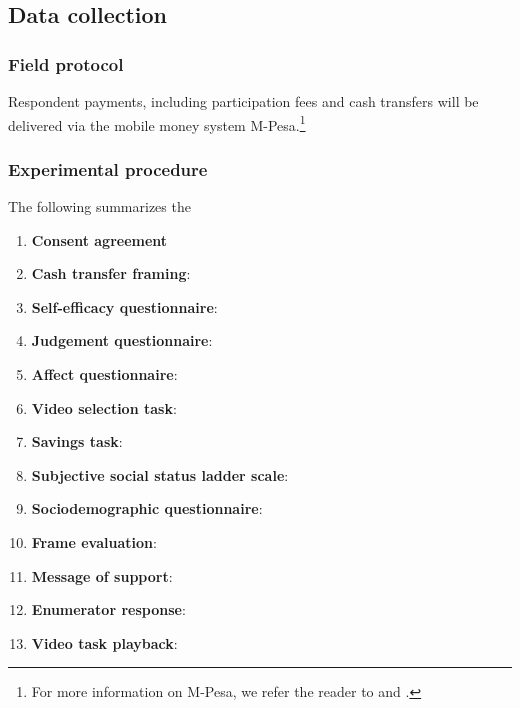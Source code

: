 \documentclass[11pt, a4paper]{article}\usepackage[]{graphicx}\usepackage[]{color}
\begin{document}
    \subsection{Data collection}

        \subsubsection{Field protocol}


            Respondent payments, including participation fees and cash transfers will be delivered via the mobile money system M-Pesa.\footnote{For more information on M-Pesa, we refer the reader to \textcite{jack_mobile_2011} and \textcite{mbiti_mobile_2011}.}

        \subsubsection{Experimental procedure}

            The following summarizes the

            \begin{enumerate}
                \item \textbf{Consent agreement}
                \item \textbf{Cash transfer framing}:
                \item \textbf{Self-efficacy questionnaire}:
                \item \textbf{Judgement questionnaire}:
                \item \textbf{Affect questionnaire}:
                \item \textbf{Video selection task}:
                \item \textbf{Savings task}:
                \item \textbf{Subjective social status ladder scale}:
                \item \textbf{Sociodemographic questionnaire}:
                \item \textbf{Frame evaluation}:
                \item \textbf{Message of support}:
                \item \textbf{Enumerator response}:
                \item \textbf{Video task playback}:
            \end{enumerate}
\end{document}
